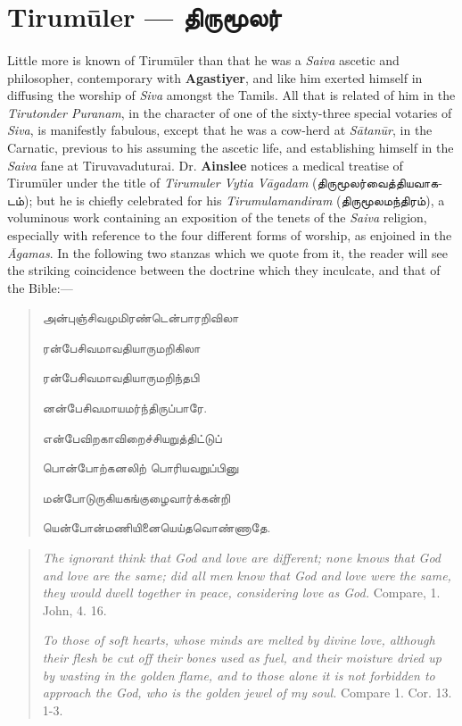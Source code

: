 \documentclass{article}
\newcommand{\TamilText}[1]{\texttamil{#1}}
\newcommand{\TamilBold}[1]{\texttamil{\textbf{#1}}}
\newcommand{\tam}[1]{\TamilText{#1}}
\newcommand{\tambold}[1]{\TamilBold{#1}}
\begin{document}
\section{Tirum\={u}ler --- \tambold{திருமூலர்}}
\paragraph{}
Little more is known of Tirum\={u}ler than that he was a \emph{Saiva} ascetic and philosopher, contemporary with \textbf{Agastiyer}, and like him exerted himself in diffusing the worship of \emph{Siva} amongst the Tamils. All that is related of him in the \emph{Tirutonder Puranam}, in the character of one of the sixty-three special votaries of \emph{Siva}, is manifestly fabulous, except that he was a cow-herd at \emph{S\={a}tan\={u}r}, in the Carnatic, previous to his assuming the ascetic life, and establishing himself in the \emph{Saiva} fane at Tiruvavaduturai. Dr. \textbf{Ainslee} notices a medical treatise of Tirum\={u}ler under the title of \emph{Tirumuler Vytia V\={a}gadam} (\tam{திருமூலர்வைத்தியவாகடம்}); but he is chiefly celebrated for his \emph{Tirumulamandiram} (\tam{திருமூலமந்திரம்}), a voluminous work containing an exposition of the tenets of the \emph{Saiva} religion, especially with reference to the four different forms of worship, as enjoined in the \emph{\={A}gamas}. In the following two stanzas which we quote from it, the reader will see the striking coincidence between the doctrine which they inculcate, and that of the Bible:---
\begin{quotation}\small
\tam{அன்புஞ்சிவமுமிரண்டென்பாரறிவிலா}

\tam{ரன்பேசிவமாவதியாருமறிகிலா}

\tam{ரன்பேசிவமாவதியாருமறிந்தபி}

\tam{னன்பேசிவமாயமர்ந்திருப்பாரே}.

\bigskip

\tam{என்பேவிறகாவிறைச்சியறுத்திட்டுப்‌}

\tam{பொன்போற்கனலிற்‌ பொரியவறுப்‌பினு}

\tam{மன்போடுருகியகங்குழைவார்க்கன்றி}

\tam{யென்போன்மணியினையெய்தவொண்ணாதே}.
\end{quotation}
\begin{quotation}\small
\emph{The ignorant think that God and love are different; none knows that God and love are the same; did all men know that God and love were the same, they would dwell together in peace, considering love as God.} Compare, 1. John, 4. 16.

\emph{To those of soft hearts, whose minds are melted by divine love, although their flesh be cut off their bones used as fuel, and their moisture dried up by wasting in the golden flame, and to those alone it is not forbidden to approach the God, who is the golden jewel of my soul.} Compare 1. Cor. 13. 1-3.
\end{quotation}
\end{document}
